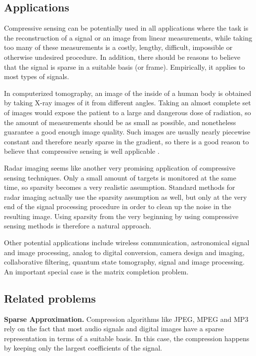 \documentclass[
  english,        %
  font=times,     %
  onecolumn,      %
]{tumarticle}
\numberwithin{equation}{section} %
\begin{document}
\begin{large}
\begin{adjustwidth}{0pt}{0pt}
\subsection{Applications}

Compressive sensing can be potentially used in all applications where the task is the reconstruction of a signal or an image from linear measurements, while taking too many of these measurements is a costly, lengthy, difficult, impossible or otherwise undesired procedure. In addition, there should be reasons to believe that the signal is sparse in a suitable basis (or frame). Empirically, it applies to most types of signals.

In computerized tomography, an image of the inside of a human body is obtained by taking X-ray images of it from different angles. Taking an almost complete set of images would expose the patient to a large and dangerous dose of radiation, so the amount of measurements should be as small as possible, and nonetheless guarantee a good enough image quality. Such images are usually nearly piecewise constant and therefore nearly sparse in the gradient, so there is a good reason to believe that compressive sensing is well applicable \cite{Robust-Uncertainty}.

Radar imaging seems like another very promising application of compressive sensing techniques. Only a small amount of targets is monitored at the same time, so sparsity becomes a very realistic assumption. Standard methods for radar imaging actually use the sparsity assumption as well, but only at the very end of the signal processing procedure in order to clean up the noise in the resulting image. Using sparsity from the very beginning by using compressive sensing methods is therefore a natural approach.

Other potential applications include wireless communication, astronomical signal and image processing, analog to digital conversion, camera design and imaging, collaborative filtering, quantum state tomography, signal and image processing. An important special case is the matrix completion problem.

\subsection{Related problems}

\textbf{Sparse Approximation.} Compression algorithms like JPEG, MPEG and MP3 rely on the fact that most audio signals and digital images have a sparse representation in terms of a suitable basis. In this case, the compression happens by keeping only the largest coefficients of the signal.


\end{adjustwidth}
\end{large}
\end{document}
